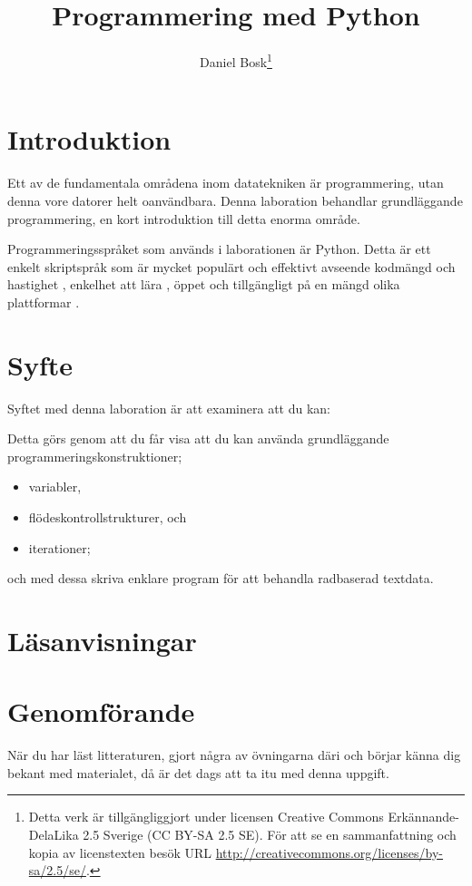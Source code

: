 \documentclass[a4paper,nocourse]{miunasgn}
\title{Programmering med Python}
\author{
  Daniel Bosk\footnote{%
    Detta verk är tillgängliggjort under licensen Creative Commons 
    Erkännande-DelaLika 2.5 Sverige (CC BY-SA 2.5 SE).
    För att se en sammanfattning och kopia av licenstexten besök URL 
    \url{http://creativecommons.org/licenses/by-sa/2.5/se/}.
  }
}
\date{\svnId}
\begin{document}
\maketitle
\thispagestyle{foot}
\tableofcontents

\section{Introduktion}
\label{sec:intro}
Ett av de fundamentala områdena inom datatekniken är programmering, utan denna 
vore datorer helt oanvändbara.
Denna laboration behandlar grundläggan\-de programmering, en kort introduktion 
till detta enorma område.

Programmeringsspråket som används i laborationen är Python.
Detta är ett enkelt skriptspråk som är mycket populärt \cite{PythonWeb} och 
effektivt avseende kodmängd och hastighet \cite{PythonWeb,Shootout}, enkelhet 
att lära \cite{PythonWeb,grandell2006complicate}, öppet och tillgängligt på en 
mängd olika plattformar \cite{PythonWeb}.


\section{Syfte}
\label{sec:aim}
Syftet med denna laboration är att examinera att du kan:
\begin{itemize}
  
\end{itemize}
Detta görs genom att du får visa att du kan använda grundläggande 
programmeringskonstruktioner;
\begin{itemize}
  \item variabler,
  \item flödeskontrollstrukturer, och
  \item iterationer;
\end{itemize}
och med dessa skriva enklare program för att behandla radbaserad textdata.


\section{Läsanvisningar}
\label{sec:reading}



\section{Genomförande}
\label{sec:work}
När du har läst litteraturen, gjort några av övningarna däri och börjar känna 
dig bekant med materialet, då är det dags att ta itu med denna uppgift.
\end{document}
